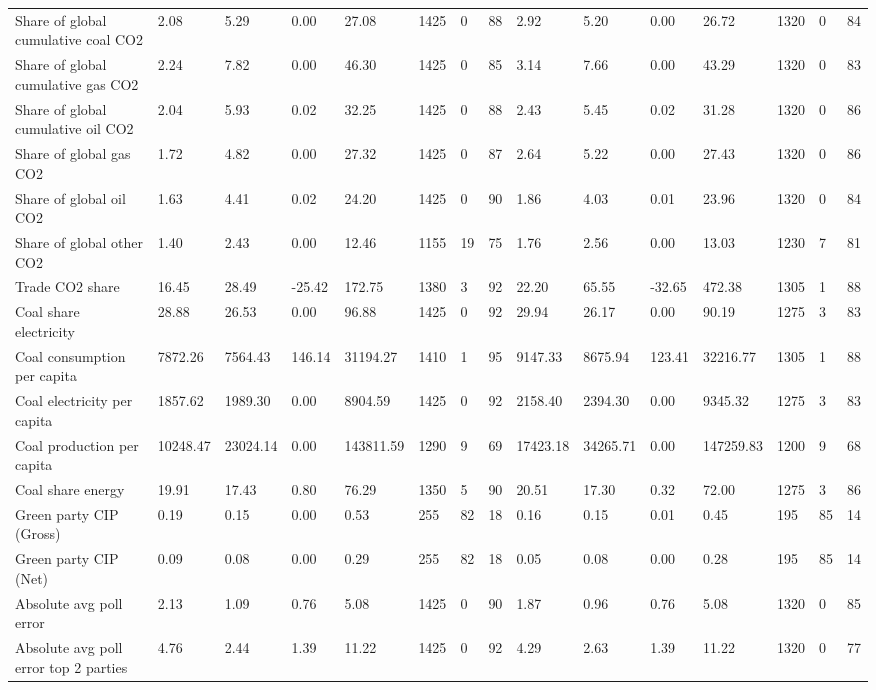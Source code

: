 \begin{longtable}{lllllllllllllll}
Share of global cumulative coal CO2 & 2.08 & 5.29 & 0.00 & 27.08 & 1425 & 0 & 88 & 2.92 & 5.20 & 0.00 & 26.72 & 1320 & 0 & 84\\
Share of global cumulative gas CO2 & 2.24 & 7.82 & 0.00 & 46.30 & 1425 & 0 & 85 & 3.14 & 7.66 & 0.00 & 43.29 & 1320 & 0 & 83\\
Share of global cumulative oil CO2 & 2.04 & 5.93 & 0.02 & 32.25 & 1425 & 0 & 88 & 2.43 & 5.45 & 0.02 & 31.28 & 1320 & 0 & 86\\
\addlinespace
Share of global gas CO2 & 1.72 & 4.82 & 0.00 & 27.32 & 1425 & 0 & 87 & 2.64 & 5.22 & 0.00 & 27.43 & 1320 & 0 & 86\\
Share of global oil CO2 & 1.63 & 4.41 & 0.02 & 24.20 & 1425 & 0 & 90 & 1.86 & 4.03 & 0.01 & 23.96 & 1320 & 0 & 84\\
Share of global other CO2 & 1.40 & 2.43 & 0.00 & 12.46 & 1155 & 19 & 75 & 1.76 & 2.56 & 0.00 & 13.03 & 1230 & 7 & 81\\
Trade CO2 share & 16.45 & 28.49 & -25.42 & 172.75 & 1380 & 3 & 92 & 22.20 & 65.55 & -32.65 & 472.38 & 1305 & 1 & 88\\
Coal share electricity & 28.88 & 26.53 & 0.00 & 96.88 & 1425 & 0 & 92 & 29.94 & 26.17 & 0.00 & 90.19 & 1275 & 3 & 83\\
\addlinespace
Coal consumption per capita & 7872.26 & 7564.43 & 146.14 & 31194.27 & 1410 & 1 & 95 & 9147.33 & 8675.94 & 123.41 & 32216.77 & 1305 & 1 & 88\\
Coal electricity per capita & 1857.62 & 1989.30 & 0.00 & 8904.59 & 1425 & 0 & 92 & 2158.40 & 2394.30 & 0.00 & 9345.32 & 1275 & 3 & 83\\
Coal production per capita & 10248.47 & 23024.14 & 0.00 & 143811.59 & 1290 & 9 & 69 & 17423.18 & 34265.71 & 0.00 & 147259.83 & 1200 & 9 & 68\\
Coal share energy & 19.91 & 17.43 & 0.80 & 76.29 & 1350 & 5 & 90 & 20.51 & 17.30 & 0.32 & 72.00 & 1275 & 3 & 86\\
Green party CIP (Gross) & 0.19 & 0.15 & 0.00 & 0.53 & 255 & 82 & 18 & 0.16 & 0.15 & 0.01 & 0.45 & 195 & 85 & 14\\
\addlinespace
Green party CIP (Net) & 0.09 & 0.08 & 0.00 & 0.29 & 255 & 82 & 18 & 0.05 & 0.08 & 0.00 & 0.28 & 195 & 85 & 14\\
Absolute avg poll error & 2.13 & 1.09 & 0.76 & 5.08 & 1425 & 0 & 90 & 1.87 & 0.96 & 0.76 & 5.08 & 1320 & 0 & 85\\
Absolute avg poll error top 2 parties & 4.76 & 2.44 & 1.39 & 11.22 & 1425 & 0 & 92 & 4.29 & 2.63 & 1.39 & 11.22 & 1320 & 0 & 77\\

\end{longtable}
